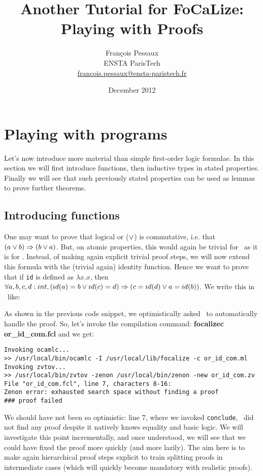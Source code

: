 \documentclass[11pt,a4paper,twoside,onecolumn,fullpage]{article}
\author{Fran\c{c}ois Pessaux\\
  ENSTA ParisTech\\
  \url{francois.pessaux@ensta-paristech.fr}}
\title{Another Tutorial for {F}o{C}a{L}ize:\\
  Playing with Proofs}
\date{December 2012}
\begin{document}
\maketitle




\section{Playing with programs}
Let's now introduce more material than simple first-order logic
formulae. In this section we will first introduce functions, then
inductive types in stated properties. Finally we will see that
such previously stated properties can be used as lemmas to prove further
theorems.

\subsection{Introducing functions}
One may want to prove that logical or ($\vee$) is commutative,
i.e. that $(a \vee b) \Rightarrow (b \vee a)$. But, on atomic
properties, this would again be trivial for \zenon\ as it is for
\coq. Instead, of making again explicit trivial proof steps, we will
now extend this formula with the (trivial again) identity
function. Hence we want to prove that if \verb"id" is defined as
$\lambda x.x$, then
$\forall a, b, c, d : int, (id (a) = b \vee id (c) = d) \Rightarrow (c = id (d) \vee a = id (b))$.
We write this in \focal\ like:

{\scriptsize
}

As shown in the previous code snippet, we optimistically asked \zenon\ to
automatically handle the proof. So, let's invoke the compilation
command: \textbf{focalizec or\_id\_com.fcl} and we get:

{\scriptsize
\begin{verbatim}
Invoking ocamlc...
>> /usr/local/bin/ocamlc -I /usr/local/lib/focalize -c or_id_com.ml
Invoking zvtov...
>> /usr/local/bin/zvtov -zenon /usr/local/bin/zenon -new or_id_com.zv
File "or_id_com.fcl", line 7, characters 8-16:
Zenon error: exhausted search space without finding a proof
### proof failed
\end{verbatim}}

We should have not been so optimistic: line 7, where we invoked \lstinline"conclude",
\zenon\ did not find any proof despite it natively knows equality and
basic logic. We will investigate this point incrementally, and once
understood, we will see that we could have fixed the proof more
quickly (and more lazily). The aim here is to make again hierarchical
proof steps explicit to train splitting proofs in intermediate cases
(which will quickly become mandatory with realistic proofs).
\end{document}
